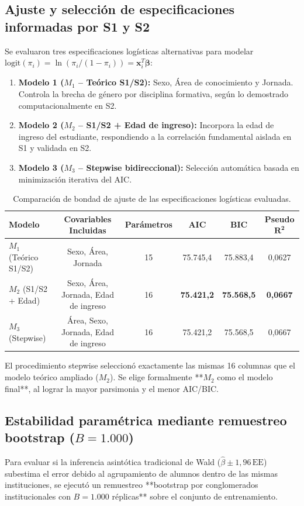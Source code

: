 \documentclass[11pt,a4paper]{article}
\begin{document}
\subsection{Ajuste y selección de especificaciones informadas por S1 y S2}
Se evaluaron tres especificaciones logísticas alternativas para modelar $\text{logit}(\pi_i) = \ln(\pi_i / (1 - \pi_i)) = \mathbf{x}_i^T \boldsymbol{\beta}$:
\begin{enumerate}[leftmargin=*]
\item \textbf{Modelo 1 ($M_1$ -- Teórico S1/S2):} Sexo, Área de conocimiento y Jornada. Controla la brecha de género por disciplina formativa, según lo demostrado computacionalmente en S2.
\item \textbf{Modelo 2 ($M_2$ -- S1/S2 + Edad de ingreso):} Incorpora la edad de ingreso del estudiante, respondiendo a la correlación fundamental aislada en S1 y validada en S2.
\item \textbf{Modelo 3 ($M_3$ -- Stepwise bidireccional):} Selección automática basada en minimización iterativa del AIC.
\end{enumerate}

\begin{table}[h!]
\centering
\small
\caption{Comparación de bondad de ajuste de las especificaciones logísticas evaluadas.}
\begin{tabular}{lccccc}
\toprule
\textbf{Modelo} & \textbf{Covariables Incluidas} & \textbf{Parámetros} & \textbf{AIC} & \textbf{BIC} & \textbf{Pseudo} $\mathbf{R^2}$ \\
\midrule
$M_1$ (Teórico S1/S2) & Sexo, Área, Jornada & 15 & 75.745,4 & 75.883,4 & 0,0627 \\
$M_2$ (S1/S2 + Edad)  & Sexo, Área, Jornada, Edad de ingreso & 16 & \textbf{75.421,2} & \textbf{75.568,5} & \textbf{0,0667} \\
$M_3$ (Stepwise)      & Área, Sexo, Jornada, Edad de ingreso & 16 & 75.421,2 & 75.568,5 & 0,0667 \\
\bottomrule
\end{tabular}
\end{table}

El procedimiento stepwise seleccionó exactamente las mismas 16 columnas que el modelo teórico ampliado ($M_2$). Se elige formalmente **$M_2$ como el modelo final**, al lograr la mayor parsimonia y el menor AIC/BIC.

\subsection{Estabilidad paramétrica mediante remuestreo bootstrap ($B=1.000$)}
Para evaluar si la inferencia asintótica tradicional de Wald ($\widehat{\beta} \pm 1,96\,\text{EE}$) subestima el error debido al agrupamiento de alumnos dentro de las mismas instituciones, se ejecutó un remuestreo **bootstrap por conglomerados institucionales con $B=1.000$ réplicas** sobre el conjunto de entrenamiento.
\end{document}
